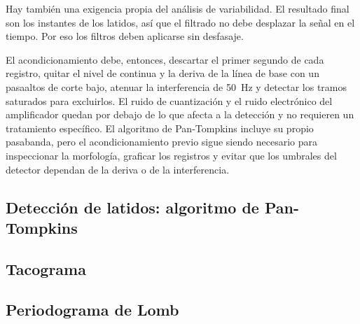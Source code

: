 Hay también una exigencia propia del análisis de variabilidad. El resultado final son los instantes de los latidos, así que el filtrado no debe desplazar la señal en el tiempo. Por eso los filtros deben aplicarse sin desfasaje.

El acondicionamiento debe, entonces, descartar el primer segundo de cada registro, quitar el nivel de continua y la deriva de la línea de base con un pasaaltos de corte bajo, atenuar la interferencia de \SI{50}{\hertz} y detectar los tramos saturados para excluirlos. El ruido de cuantización y el ruido electrónico del amplificador quedan por debajo de lo que afecta a la detección y no requieren un tratamiento específico. El algoritmo de Pan-Tompkins incluye su propio pasabanda, pero el acondicionamiento previo sigue siendo necesario para inspeccionar la morfología, graficar los registros y evitar que los umbrales del detector dependan de la deriva o de la interferencia.



\subsection{Detección de latidos: algoritmo de Pan-Tompkins}
\label{sec:met-pantompkins}

\subsection{Tacograma}
\label{sec:met-tacograma}

\subsection{Periodograma de Lomb}
\label{sec:met-lomb}
